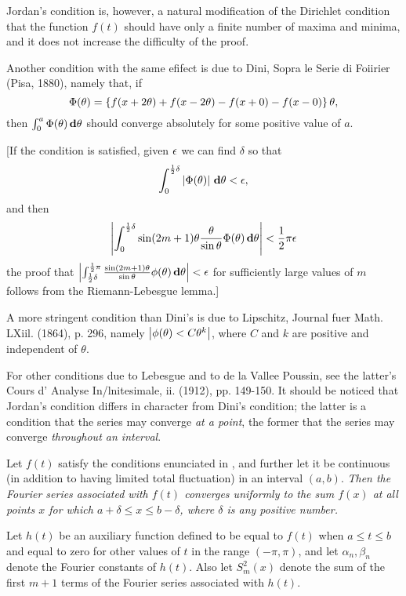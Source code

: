Jordan's condition is, however, a natural modification of the
Dirichlet condition that the function $f(t)$ should have only a finite
number of maxima and minima, and it does not increase the difficulty
of the proof.

Another condition with the same efifect is due to Dini,
Sopra le Serie di Foiirier (Pisa, 1880),
namely that, if
$$
\Phi(\theta)
=
\left\{ 
  f(x+2\theta) + f(x-2\theta) - f(x+0) - f(x-0)
 \right\}
\theta,
$$
then
$\int_{0}^{a} \Phi(\theta) \, \mathbf{d} \theta$ should converge absolutely for some positive value of
$a$.

[If the condition is satisfied, given $\epsilon$ we can find $\delta$ so that
$$
\int_{0}^{\frac{1}{2}\delta}
\left| 
  \Phi(\theta)
 \right|
\, \mathbf{d} \theta
<
\epsilon,
$$
and then
$$
\left| 
  \int_{0}^{\frac{1}{2}\delta}
  \sin (2m+1)\theta
  \frac{\theta}{\sin \theta}
  \Phi(\theta)
  \, \mathbf{d} \theta
 \right|
<
\frac{1}{2} \pi \epsilon
$$
the proof that
$
\left| 
  \int_{\frac{1}{2}\delta}^{\frac{1}{2} \pi}
  \frac{\sin (2m+1)\theta}{\sin \theta}
  \phi(\theta)
  \, \mathbf{d} \theta
 \right|
<
\epsilon
$
for sufficiently large values of $m$
follows from the Riemann-Lebesgue lemma.]

A more stringent condition than Dini's is due to Lipschitz,
Journal fuer Math. LXiil. (1864), p. 296, %
namely $\left| \phi(\theta) < C \theta^{k} \right|$, where $C$ and
$k$ are positive and independent of $\theta$.

For other conditions due to Lebesgue and to
de la Vallee Poussin, %
see the latter's
Cours d' Analyse In/lnitesimale, ii. (1912), pp. 149-150. %
It should be noticed that Jordan's condition differs in character from
Dini's condition; the latter is a condition that the series may
converge \emph{at a point}, the former that the series may converge
\emph{throughout an interval}.

Let $f(t)$ satisfy the conditions enunciated in ,
and further let it be continuous
(in addition to having limited total fluctuation) in
an interval $(a, b)$. \emph{Then the Fourier series associated with $f(t)$
  converges uniformly to the sum $f(x)$ at all points $x$ for which
  $a + \delta \leq x \leq b - \delta$, where $\delta$ is any positive number.}

Let $h(t)$ be an auxiliary function defined to be equal to $f(t)$ when
$a \leq t \leq b$ and equal to zero for other values of $t$ in the range
$(-\pi, \pi)$, and
let $\alpha_{n}, \beta_{n}$ denote the Fourier constants of $h(t)$.
Also let $S_{m}^{2}(x)$ denote the sum of the first $m + 1$ terms of the
Fourier series associated with $h(t)$.

